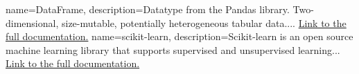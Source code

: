 
{
    name=DataFrame,
    description={Datatype from the Pandas library. Two-dimensional, size-mutable, potentially heterogeneous tabular data.... \href{https://pandas.pydata.org/pandas-docs/stable/reference/api/pandas.DataFrame.html}{Link to the full documentation.}}
}
{
    name=scikit-learn,
    description={Scikit-learn is an open source machine learning library that supports supervised and unsupervised learning... \href{https://scikit-learn.org/stable/getting_started.html}{Link to the full documentation.}}
}
